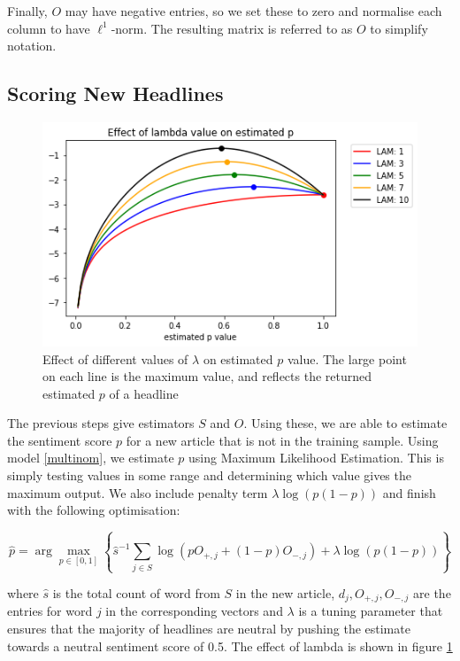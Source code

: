 \noindent
Finally, $O$ may have negative entries, so we set these to zero and normalise each column to have $\ell^1$-norm. The resulting matrix is referred to as $O$ to simplify notation.

\subsection{Scoring New Headlines}
\label{sub:new-headlines}

\begin{figure}[!t]
    \begin{center}
        \includegraphics[scale=.75]{./pics/lam-effect.png}
        \caption[Effect of $\lambda$]{Effect of different values of $\lambda$ on estimated $p$ value. The large point on each line is the maximum value, and reflects the returned estimated $p$ of a headline}
        \label{fig:lam-effect}
    \end{center}
\end{figure}

The previous steps give estimators $S$ and $O$. Using these, we are able to estimate the sentiment score $p$ for a new article that is not in the training sample. Using model \ref{multinom}, we estimate $p$ using Maximum Likelihood Estimation. This is simply testing values in some range and determining which value gives the maximum output. We also include penalty term $\lambda \log(p(1-p))$ and finish with the following optimisation:

\begin{equation}
\widehat p = \arg \max_{p \in [0,1]} \left\{ \widehat s^{-1} \sum_{j \in S} \log (p O_{+,j} + (1-p) O_{-,j}) + \lambda \log(p(1-p)) \right\}
\end{equation}

\noindent
where $\widehat s$ is the total count of word from $S$ in the new article, $d_j, O_{+,j}, O_{-,j}$ are the entries for word $j$ in the corresponding vectors and $\lambda$ is a tuning parameter that ensures that the majority of headlines are neutral by pushing the estimate towards a neutral sentiment score of 0.5. The effect of lambda is shown in figure \ref{fig:lam-effect}


